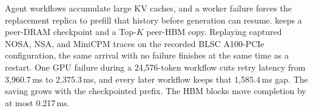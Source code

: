 Agent workflows accumulate large KV caches, and a worker failure forces the
replacement replica to prefill that history before generation can resume.
\system keeps a peer-DRAM checkpoint and a Top-$K$ peer-HBM copy. Replaying
captured NOSA, NSA, and MiniCPM traces on the recorded BLSC A100-PCIe
configuration, the same arrival with no failure finishes at the same time as
a restart. One GPU failure during a 24{,}576-token workflow cuts retry
latency from 3{,}960.7\,ms to 2{,}375.3\,ms, and every later workflow keeps
that 1{,}585.4\,ms gap. The saving grows with the checkpointed prefix. The
HBM blocks move completion by at most 0.217\,ms.
